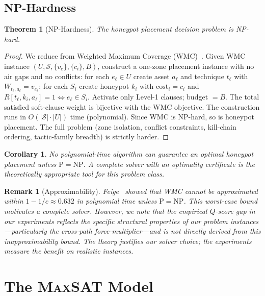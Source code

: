 \documentclass[journal]{IEEEtran}
\newtheorem{theorem}{Theorem}
\newtheorem{corollary}{Corollary}
\newtheorem{remark}{Remark}
\newcommand{\MAXSAT}{\textsc{MaxSAT}}
\newcommand{\qscore}{$Q$-score}
\begin{document}
\subsection{NP-Hardness}
\label{sec:np}

\begin{theorem}[NP-Hardness]
\label{thm:nph}
The honeypot placement decision problem is NP-hard.
\end{theorem}

\begin{proof}
We reduce from Weighted Maximum Coverage (WMC)~\cite{feige1998}. Given
WMC instance $(U,\mathcal{S},\{v_e\},\{c_i\},B)$, construct a
one-zone placement instance with no air gaps and no conflicts: for each
$e_\ell\in U$ create asset $a_\ell$ and technique $t_\ell$ with
$W_{t_\ell,a_\ell}=v_{e_\ell}$; for each $S_i$ create honeypot $k_i$
with $\mathrm{cost}_i=c_i$ and $R[t_\ell,k_i,a_\ell]=1\iff e_\ell\in
S_i$. Activate only Level-1 clauses; budget $=B$. The total satisfied
soft-clause weight is bijective with the WMC objective. The construction
runs in $O(|\mathcal{S}|\cdot|U|)$ time (polynomial). Since WMC is
NP-hard, so is honeypot placement. The full problem (zone isolation,
conflict constraints, kill-chain ordering, tactic-family breadth) is
strictly harder.
\end{proof}

\begin{corollary}
No polynomial-time algorithm can guarantee an optimal honeypot placement
unless $\mathrm{P}=\mathrm{NP}$. A complete solver with an optimality
certificate is the theoretically appropriate tool for this problem class.
\end{corollary}

\begin{remark}[Approximability]
Feige~\cite{feige1998} showed that WMC cannot be approximated within
$1-1/e\approx0.632$ in polynomial time unless $\mathrm{P}=\mathrm{NP}$.
This worst-case bound motivates a complete solver. However, we note that
the empirical \qscore{} gap in our experiments reflects the specific
structural properties of our problem instances---particularly the
cross-path force-multiplier---and is not directly derived from this
inapproximability bound. The theory justifies our solver choice; the
experiments measure the benefit on realistic instances.
\end{remark}

\section{The \MAXSAT{} Model}
\label{sec:model}
\end{document}
